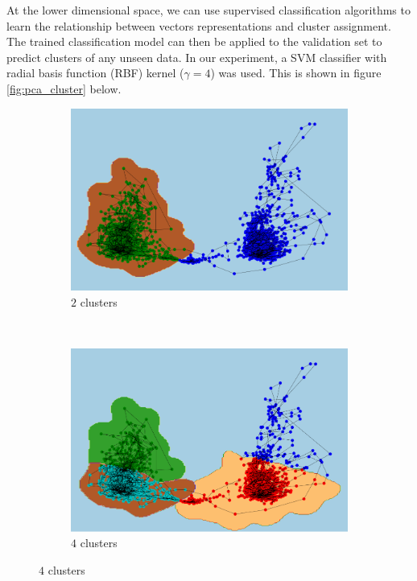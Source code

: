 \documentclass[11pt]{article} %
\theoremstyle{plain}
\theoremstyle{definition}
\begin{document}
At the lower dimensional space, we can use supervised classification algorithms to learn the relationship between vectors representations and cluster assignment. The trained classification model can then be applied to the validation set to predict clusters of any unseen data. In our experiment, a SVM classifier with radial basis function (RBF) kernel (\(\gamma=4\)) was used. This is shown in figure \ref{fig:pca_cluster} below.

\begin{figure}[H]
	\centering
	
	\begin{subfigure}[b]{0.48\textwidth}
		\includegraphics[width=\textwidth]{pca_cluster_2.PNG}
		\caption{\(2\) clusters}
		\label{fig:pca_cluster_2}
	\end{subfigure}
	~
	\begin{subfigure}[b]{0.48\textwidth}
		\includegraphics[width=\textwidth]{pca_cluster_4.PNG}
		\caption{\(4\) clusters}
		\label{fig:pca_cluster_4}
	\end{subfigure}


\end{figure}
\end{document}
